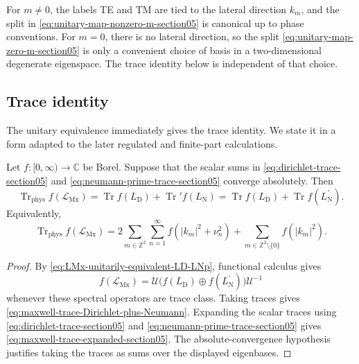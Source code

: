 \documentclass[11pt]{article}
\providecommand{\C}{\mathbb{C}}
\providecommand{\Z}{\mathbb{Z}}
\providecommand{\Tr}{\operatorname{Tr}}
\providecommand{\Trphys}{\operatorname{Tr}_{\mathrm{phys}}}
\providecommand{\abs}[1]{\left\lvert #1\right\rvert}
\providecommand{\paren}[1]{\left(#1\right)}
\providecommand{\LMx}{\mathcal L_{\mathrm{Mx}}}
\providecommand{\LD}{L_{\mathrm D}}
\providecommand{\LN}{L_{\mathrm N}}
\providecommand{\LNp}{L_{\mathrm N}^{\prime}}
\numberwithin{equation}{section}
\begin{document}
\begin{remark}
\label{rem:noncanonical-zero-m-split-section05}
For \(m\ne0\), the labels TE and TM are tied to the lateral direction \(k_m\),
and the split in \eqref{eq:unitary-map-nonzero-m-section05} is canonical up to
phase conventions.  For \(m=0\), there is no lateral direction, so the split
\eqref{eq:unitary-map-zero-m-section05} is only a convenient choice of basis in
a two-dimensional degenerate eigenspace.  The trace identity below is
independent of that choice.
\end{remark}

\subsection{Trace identity}
\label{subsec:te-tm-trace-identity-section05}

The unitary equivalence immediately gives the trace identity.  We state it in
a form adapted to the later regulated and finite-part calculations.

\begin{theorem}
\label{thm:maxwell-trace-Dirichlet-Neumann}
Let \(f:[0,\infty)\to\C\) be Borel.  Suppose that the scalar sums in
\eqref{eq:dirichlet-trace-section05} and \eqref{eq:neumann-prime-trace-section05}
converge absolutely.  Then
\begin{equation}
    \boxed{
    \Trphys f(\LMx)
    =
    \Tr f(\LD)+\Tr' f(\LN)
    =
    \Tr f(\LD)+\Tr f(\LNp).
    }
    \label{eq:maxwell-trace-Dirichlet-plus-Neumann}
\end{equation}
Equivalently,
\begin{equation}
    \Trphys f(\LMx)
    =
    2\sum_{m\in\Z^2}\sum_{n=1}^{\infty}
    f\paren{\abs{k_m}^2+\nu_n^2}
    +
    \sum_{m\in\Z^2\setminus\{0\}}
    f\paren{\abs{k_m}^2} .
    \label{eq:maxwell-trace-expanded-section05}
\end{equation}
\end{theorem}

\begin{proof}
By \eqref{eq:LMx-unitarily-equivalent-LD-LNp}, functional calculus gives
\begin{equation*}
    f(\LMx)
    =
    \mathcal U\bigl(f(\LD)\oplus f(\LNp)\bigr)\mathcal U^{-1}
\end{equation*}
whenever these spectral operators are trace class.  Taking traces gives
\eqref{eq:maxwell-trace-Dirichlet-plus-Neumann}.  Expanding the scalar traces
using \eqref{eq:dirichlet-trace-section05} and
\eqref{eq:neumann-prime-trace-section05} gives
\eqref{eq:maxwell-trace-expanded-section05}.  The absolute-convergence
hypothesis justifies taking the traces as sums over the displayed eigenbases.
\end{proof}
\end{document}
